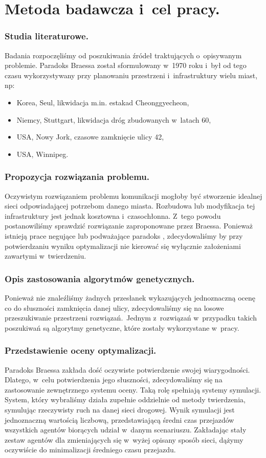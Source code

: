 \documentclass[twoside,12pt]{report}
\begin{document}
\section{Metoda badawcza i~cel pracy.}
\subsubsection{Studia literaturowe.}
Badania rozpoczęliśmy od poszukiwania źródeł traktujących o~opisywanym problemie. Paradoks Braessa został sformułowany w~1970 roku i~był od tego czasu wykorzystywany przy planowaniu przestrzeni i~infrastruktury wielu miast, np:

\begin{itemize}
\item Korea, Seul, likwidacja m.in. estakad Cheonggyecheon,
\item Niemcy, Stuttgart, likwidacja dróg zbudowanych w~latach 60,
\item USA, Nowy Jork, czasowe zamknięcie ulicy 42,
\item USA, Winnipeg.\cite{urban}
\end{itemize}  

\subsubsection{Propozycja rozwiązania problemu.}
Oczywistym rozwiązaniem problemu komunikacji mogłoby być stworzenie idealnej sieci odpowiadającej potrzebom danego miasta. Rozbudowa lub modyfikacja tej infrastruktury jest jednak kosztowna i~czasochłonna. Z~tego powodu postanowiliśmy sprawdzić rozwiązanie zaproponowane przez Braessa. Ponieważ istnieją prace negujące lub podważające paradoks\cite{newinsights} , zdecydowaliśmy by przy potwierdzaniu wyniku optymalizacji nie kierować się wyłącznie założeniami zawartymi w~twierdzeniu.

\subsubsection{Opis zastosowania algorytmów genetycznych.}
Ponieważ nie znaleźliśmy żadnych przesłanek wykazujących jednoznaczną ocenę co do słuszności zamknięcia danej ulicy, zdecydowaliśmy się na losowe przeszukiwanie przestrzeni rozwiązań.~Jednym z~rozwiązań w~przypadku takich poszukiwań są algorytmy genetyczne, które zostały wykorzystane w~pracy.

\subsubsection{Przedstawienie oceny optymalizacji.}
Paradoks Braessa zakłada dość oczywiste potwierdzenie swojej wiarygodności. Dlatego, w~celu potwierdzenia jego słuszności, zdecydowaliśmy się na zastosowanie zewnętrznego systemu oceny. Taką rolę spełniają systemy symulacji. System, który wybraliśmy działa zupełnie oddzielnie od metody twierdzenia, symulując rzeczywisty ruch na danej sieci drogowej. Wynik symulacji jest jednoznaczną wartością liczbową, przedstawiającą średni czas przejazdów wszystkich agentów biorących udział w~danym scenariuszu. Zakładając stały zestaw agentów dla zmieniających się w~wyżej opisany sposób sieci, dążymy oczywiście do minimalizacji średniego czasu przejazdu.
\end{document}
